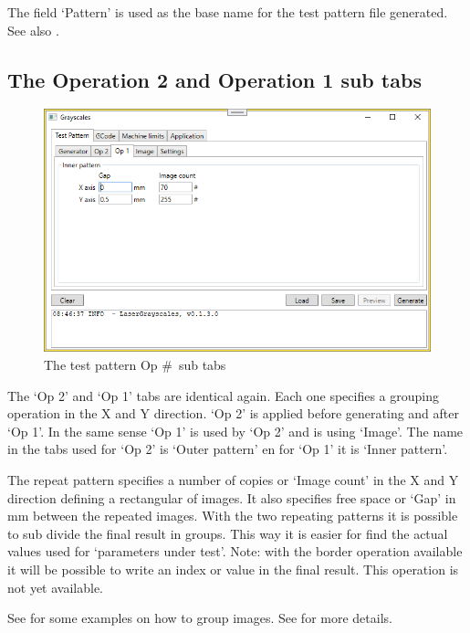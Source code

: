 The field `Pattern' is used as the base name for the test pattern file generated. See also .

\subsection{The Operation 2 and Operation 1 sub tabs}\label{TestPatternOpTab}
\begin{figure}[h!]
    \centering
    \includegraphics[width=0.8\linewidth]{./images/Operation1.png}
    \caption{The test pattern Op \#\ sub tabs}
\end{figure}

The `Op 2' and `Op 1' tabs are identical again. Each one specifies a grouping operation in the X and Y direction. `Op 2' is applied before generating and after `Op 1'.
In the same sense `Op 1' is used by `Op 2' and is using `Image'. The name in the tabs used for `Op 2'  is `Outer pattern' en for `Op 1' it is `Inner pattern'.

The repeat pattern specifies a number of copies or `Image count' in the X and Y direction defining a rectangular of images. It also specifies free space or `Gap' in mm
between the repeated images. With the two repeating patterns it is possible to sub divide the final result in groups. This way it is easier for find the actual values
used for `parameters under test'. Note: with the border operation available it will be possible to write an index or value in the final result. This operation is
not yet available.

See  for some examples on how to group images. See  for more details.

